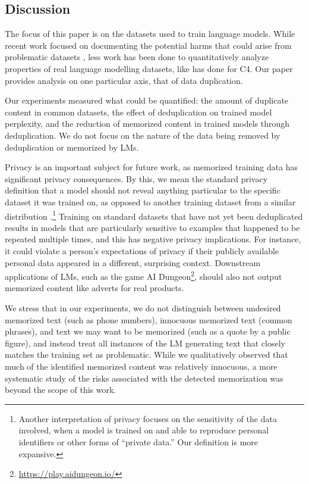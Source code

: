 \subsection{Discussion}
The focus of this paper is on the datasets used to train language models.
While recent work focused on documenting the potential harms that could arise from problematic datasets  \cite{bender2018data, gebru2020datasheets}, less work has been done to 
quantitatively analyze properties of real language modelling datasets, like \citet{dodge2021documenting} has done for C4.
Our paper provides analysis on one particular axis, that of data duplication.

Our experiments measured what could be quantified: the amount of duplicate content in common datasets, the effect of deduplication on trained model perplexity, and the reduction of memorized content in trained models through deduplication.
We do not focus on the nature of the data being removed by deduplication or memorized by LMs.

Privacy is an important subject for future work, as memorized training data has significant privacy consequences.
By this, we mean the standard privacy definition that a model should not reveal anything particular to the specific dataset it was trained on, as opposed to another training dataset from a similar distribution \citep{shokri2017membership}.\footnote{%
Another interpretation of privacy focuses on the sensitivity of the data involved, when a model is trained on and able to reproduce personal identifiers or other forms of ``private data.'' Our definition is more expansive.}
Training on standard datasets that have not yet been deduplicated results in models that are particularly sensitive to examples that happened to be repeated multiple times, and this has negative privacy implications.
For instance, it could violate a person's expectations of privacy if their publicly available personal data appeared in a different, surprising context.
Downstream applications of LMs, such as the game AI Dungeon\footnote{\url{https://play.aidungeon.io/}}, should also not output memorized content like adverts for real products. 

We stress that in our experiments, we do not distinguish between undesired memorized text (such as phone numbers), innocuous memorized text (common phrases), and text we may want to be memorized (such as a quote by a public figure), and instead treat all instances of the LM generating text that closely matches the training set as problematic.
While we qualitatively observed that much of the identified memorized content was relatively innocuous, a more systematic study of the risks associated with the detected memorization was beyond the scope of this work.

